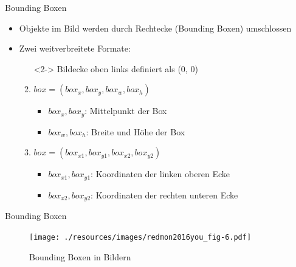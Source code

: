 \documentclass{beamer}
\begin{document}
\begin{frame}{Bounding Boxen}\label{frame:bounding_box}
    \begin{itemize}
        \item Objekte im Bild werden durch Rechtecke (Bounding Boxen) umschlossen
        \item Zwei weitverbreitete Formate:
              \begin{enumerate}
                  \item[]<2-> Bildecke oben links definiert als (0, 0)\vspace{0.5cm}
                  \item<3-> $box = (box_x, box_y, box_w, box_h)$
                        \begin{itemize}
                            \item $box_x, box_y$: Mittelpunkt der Box
                            \item $box_w, box_h$: Breite und Höhe der Box
                        \end{itemize}
                  \item<4-> $box = (box_{x1}, box_{y1}, box_{x2}, box_{y2})$
                        \begin{itemize}
                            \item $box_{x1}, box_{y1}$: Koordinaten der linken oberen Ecke
                            \item $box_{x2}, box_{y2}$: Koordinaten der rechten unteren Ecke
                        \end{itemize}
              \end{enumerate}
    \end{itemize}
\end{frame}

\begin{frame}{Bounding Boxen}
    \begin{figure}
        \centering
        \texttt{[image: ./resources/images/redmon2016you\_fig-6.pdf]}
        \caption{Bounding Boxen in Bildern~\cite[Abb.~~6]{redmon2016you}}
        \label{fig:bounding_box}
    \end{figure}
\end{frame}
\end{document}

